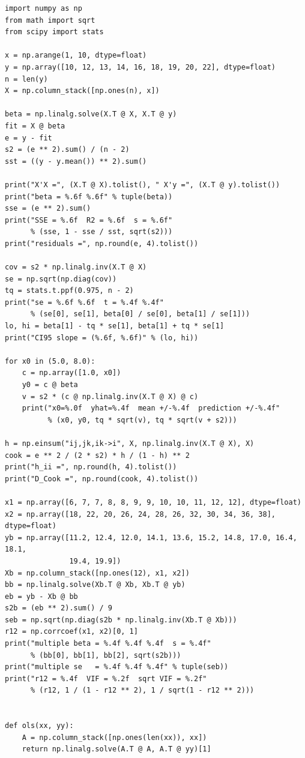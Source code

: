 \begin{lab}
\begin{verbatim}
import numpy as np
from math import sqrt
from scipy import stats

x = np.arange(1, 10, dtype=float)
y = np.array([10, 12, 13, 14, 16, 18, 19, 20, 22], dtype=float)
n = len(y)
X = np.column_stack([np.ones(n), x])

beta = np.linalg.solve(X.T @ X, X.T @ y)
fit = X @ beta
e = y - fit
s2 = (e ** 2).sum() / (n - 2)
sst = ((y - y.mean()) ** 2).sum()

print("X'X =", (X.T @ X).tolist(), " X'y =", (X.T @ y).tolist())
print("beta = %.6f %.6f" % tuple(beta))
sse = (e ** 2).sum()
print("SSE = %.6f  R2 = %.6f  s = %.6f"
      % (sse, 1 - sse / sst, sqrt(s2)))
print("residuals =", np.round(e, 4).tolist())

cov = s2 * np.linalg.inv(X.T @ X)
se = np.sqrt(np.diag(cov))
tq = stats.t.ppf(0.975, n - 2)
print("se = %.6f %.6f  t = %.4f %.4f"
      % (se[0], se[1], beta[0] / se[0], beta[1] / se[1]))
lo, hi = beta[1] - tq * se[1], beta[1] + tq * se[1]
print("CI95 slope = (%.6f, %.6f)" % (lo, hi))

for x0 in (5.0, 8.0):
    c = np.array([1.0, x0])
    y0 = c @ beta
    v = s2 * (c @ np.linalg.inv(X.T @ X) @ c)
    print("x0=%.0f  yhat=%.4f  mean +/-%.4f  prediction +/-%.4f"
          % (x0, y0, tq * sqrt(v), tq * sqrt(v + s2)))

h = np.einsum("ij,jk,ik->i", X, np.linalg.inv(X.T @ X), X)
cook = e ** 2 / (2 * s2) * h / (1 - h) ** 2
print("h_ii =", np.round(h, 4).tolist())
print("D_Cook =", np.round(cook, 4).tolist())

x1 = np.array([6, 7, 7, 8, 8, 9, 9, 10, 10, 11, 12, 12], dtype=float)
x2 = np.array([18, 22, 20, 26, 24, 28, 26, 32, 30, 34, 36, 38], dtype=float)
yb = np.array([11.2, 12.4, 12.0, 14.1, 13.6, 15.2, 14.8, 17.0, 16.4, 18.1,
               19.4, 19.9])
Xb = np.column_stack([np.ones(12), x1, x2])
bb = np.linalg.solve(Xb.T @ Xb, Xb.T @ yb)
eb = yb - Xb @ bb
s2b = (eb ** 2).sum() / 9
seb = np.sqrt(np.diag(s2b * np.linalg.inv(Xb.T @ Xb)))
r12 = np.corrcoef(x1, x2)[0, 1]
print("multiple beta = %.4f %.4f %.4f  s = %.4f"
      % (bb[0], bb[1], bb[2], sqrt(s2b)))
print("multiple se   = %.4f %.4f %.4f" % tuple(seb))
print("r12 = %.4f  VIF = %.2f  sqrt VIF = %.2f"
      % (r12, 1 / (1 - r12 ** 2), 1 / sqrt(1 - r12 ** 2)))


def ols(xx, yy):
    A = np.column_stack([np.ones(len(xx)), xx])
    return np.linalg.solve(A.T @ A, A.T @ yy)[1]



\end{verbatim}
\end{lab}
